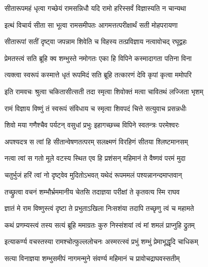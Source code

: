 \twolineshloka
{सीतारूपमहं धृत्वा गच्छेयं रामसन्निधौ}
{यदि रामो हरिस्सर्वं विज्ञास्यति न चान्यथा} %

\twolineshloka
{इत्थं विचार्य सीता सा भूत्वा रामसमीपतः}
{आगमत्तत्परीक्षार्थं सती मोहपरायणा} %

\twolineshloka
{सीतारूपां सतीं दृष्ट्वा जपन्नाम शिवेति च}
{विहस्य तत्प्रविज्ञाय नत्वावोचद् रघूद्वहः} %


\twolineshloka
{प्रेमतस्त्वं सति ब्रूहि क्व शम्भुस्ते नमोगतः}
{एका हि विपिने कस्मादागता पतिना विना} %

\twolineshloka
{त्यक्त्वा स्वरूपं कस्मात्ते धृतं रूपमिदं सति}
{ब्रूहि तत्कारणं देवि कृपां कृत्वा ममोपरि}%


\twolineshloka
{इति रामवचः श्रुत्वा चकितासीत्सती तदा}
{स्मृत्वा शिवोक्तं मत्वा चावितथं लज्जिता भृशम्} %

\twolineshloka
{रामं विज्ञाय विष्णुं तं स्वरूपं संविधाय च}
{स्मृत्वा शिवपदं चित्ते सत्युवाच प्रसन्नधीः} %

\twolineshloka
{शिवो मया गणैश्चैव पर्यटन् वसुधां प्रभुः}
{इहागच्छच्च विपिने स्वतन्त्रः परमेश्वरः} %

\twolineshloka
{अपश्यदत्र स त्वां हि सीतान्वेषणतत्परम्}
{सलक्ष्मणं विरहिणं सीतया श्लिष्टमानसम्} %

\twolineshloka
{नत्वा त्वां स गतो मूले वटस्य स्थित एव हि}
{प्रशंसन् महिमानं ते वैष्णवं परमं मुदा} %

\twolineshloka
{चतुर्भुजं हरिं त्वां नो दृष्ट्वेव मुदितोऽभवत्}
{यथेदं रूपममलं पश्यन्नानन्दमाप्तवान्} %

\twolineshloka
{तच्छ्रुत्वा वचनं शम्भौर्भ्रममानीय चेतसि}
{तदाज्ञया परीक्षां ते कृतवत्य स्मि राघव} %

\twolineshloka
{ज्ञातं मे राम विष्णुस्त्वं दृष्टा ते प्रभुताऽखिला}
{निःसशंया तदापि तच्छृणु त्वं च महामते} %

\twolineshloka
{कथं प्रणम्यस्त्वं तस्य सत्यं ब्रूहि ममाग्रतः}
{कुरु निस्संशयां त्वं मां शमलं प्राप्नुहि द्रुतम्} %


\twolineshloka
{इत्याकर्ण्य वचस्तस्या रामश्चोत्फुल्ललोचनः}
{अस्मरत्स्वं प्रभुं शम्भुं प्रेमाभूद्धृदि चाधिकम्} %

\twolineshloka
{सत्या विनाज्ञया शम्भुसमीपं नागमन्मुने}
{संवर्ण्य महिमानं च प्रावोचद्राघवस्सतीम्} %


